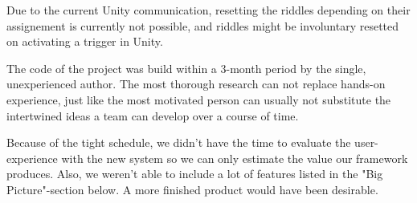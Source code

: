 Due to the current Unity communication, resetting the riddles depending on their assignement
is currently not possible, and riddles might be involuntary resetted on activating a trigger in Unity.

The code of the project was build within a 3-month period by the single, unexperienced author.
The most thorough research can not replace hands-on experience, 
just like the most motivated person can usually not substitute the intertwined ideas a team can develop over a course of time.

Because of the tight schedule, we didn't have the time to evaluate the user-experience with the new system so we can only estimate the value our framework produces.
Also, we weren't able to include a lot of features listed in the "Big Picture"-section below.
A more finished product would have been desirable.

